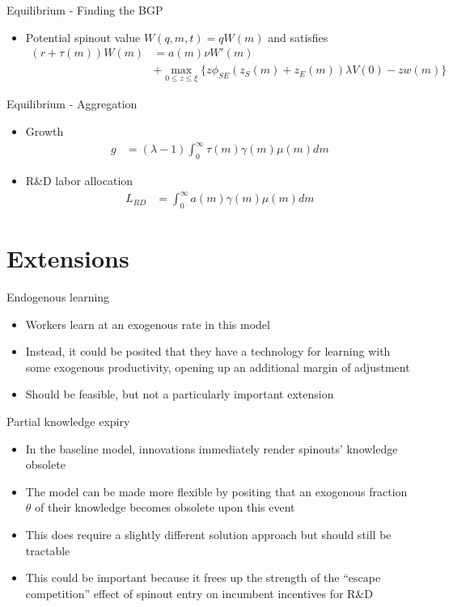\documentclass[english,usenames,dvipsnames]{beamer}
\begin{document}
\begin{frame}[label = spinout_BGP]{Equilibrium - Finding the BGP}\hyperlink{confirming_bgp}{}
\begin{itemize}
\item Potential spinout value $W(q,m,t) = qW(m)$ and satisfies 
\small
\begin{align*}
(r + \tau(m)) W(m) &= a(m) \nu W'(m) \\
&+ \max_{0 \le z \le \xi} \Big \{ z \phi_{SE}(z_S(m) + z_E(m)) \lambda V(0) - zw(m) \Big \}
\end{align*}
\end{itemize}
\end{frame}

\begin{frame}[label = aggregation_BGP]{Equilibrium - Aggregation}\hyperlink{confirming_bgp}{}
\begin{itemize}
	\item Growth
	\begin{align*}
	g &= (\lambda - 1) \int_0^{\infty} \tau(m) \gamma(m) \mu(m) dm
	\end{align*}
	\item R\&D labor allocation
	\begin{align*}
	L_{RD} &= \int_0^{\infty} a(m) \gamma(m) \mu(m) dm 
	\end{align*}
\end{itemize}
\end{frame}

\section{Extensions}

\begin{frame}{Endogenous learning}
\begin{itemize}
	\item Workers learn at an exogenous rate in this model
	\item Instead, it could be posited that they have a technology for learning with some exogenous productivity, opening up an additional margin of adjustment
	\item Should be feasible, but not a particularly important extension
\end{itemize}
\end{frame}

\begin{frame}{Partial knowledge expiry}
\begin{itemize}
	\item In the baseline model, innovations immediately render spinouts' knowledge obsolete
	\item The model can be made more flexible by positing that an exogenous fraction $\theta$ of their knowledge becomes obsolete upon this event
	\item This does require a slightly different solution approach but should still be tractable
	\item This could be important because it frees up the strength of the ``escape competition'' effect of spinout entry on incumbent incentives for R\&D
\end{itemize}
\end{frame}
\end{document}
